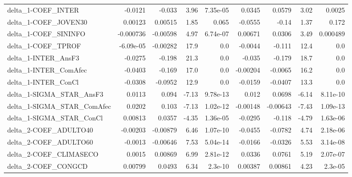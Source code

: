 \begin{tabular}{lrrrrrrrr}
delta\_1-COEF\_INTER                  &     -0.0121 &       -0.033 &    3.96 & 7.35e-05 &     0.0345 &      0.0579 &         3.02 &        0.0025 \\
delta\_1-COEF\_JOVEN30                &     0.00123 &      0.00515 &    1.85 &    0.065 &    -0.0555 &       -0.14 &         1.37 &         0.172 \\
delta\_1-COEF\_SININFO                &   -0.000736 &     -0.00598 &    4.97 & 6.74e-07 &    0.00671 &      0.0306 &         3.49 &      0.000489 \\
delta\_1-COEF\_TPROF                  &   -6.09e-05 &     -0.00282 &    17.9 &      0.0 &    -0.0044 &      -0.111 &         12.4 &           0.0 \\
delta\_1-INTER\_AnsF3                 &     -0.0275 &       -0.198 &    21.3 &      0.0 &     -0.035 &      -0.179 &         18.7 &           0.0 \\
delta\_1-INTER\_ComAfec               &     -0.0403 &       -0.169 &    17.0 &      0.0 &   -0.00204 &     -0.0065 &         16.2 &           0.0 \\
delta\_1-INTER\_ConCl                 &     -0.0308 &      -0.0952 &    12.9 &      0.0 &    -0.0159 &     -0.0407 &         13.3 &           0.0 \\
delta\_1-SIGMA\_STAR\_AnsF3            &      0.0113 &        0.094 &   -7.13 & 9.78e-13 &      0.012 &      0.0698 &        -6.14 &      8.11e-10 \\
delta\_1-SIGMA\_STAR\_ComAfec          &      0.0202 &        0.103 &   -7.13 & 1.02e-12 &   -0.00148 &    -0.00643 &        -7.43 &      1.09e-13 \\
delta\_1-SIGMA\_STAR\_ConCl            &     0.00813 &       0.0357 &   -4.35 & 1.36e-05 &    -0.0295 &      -0.118 &        -4.79 &      1.63e-06 \\
delta\_2-COEF\_ADULTO40               &    -0.00203 &     -0.00879 &    6.46 & 1.07e-10 &    -0.0455 &     -0.0782 &         4.74 &      2.18e-06 \\
delta\_2-COEF\_ADULTO60               &     -0.0013 &     -0.00646 &    7.53 & 5.04e-14 &    -0.0166 &     -0.0326 &         5.53 &      3.14e-08 \\
delta\_2-COEF\_CLIMASECO              &      0.0015 &      0.00869 &    6.99 & 2.81e-12 &     0.0336 &      0.0761 &         5.19 &      2.07e-07 \\
delta\_2-COEF\_CONGCD                 &     0.00799 &       0.0493 &    6.34 &  2.3e-10 &    0.00387 &     0.00861 &         4.23 &       2.3e-05 \\

\end{tabular}
